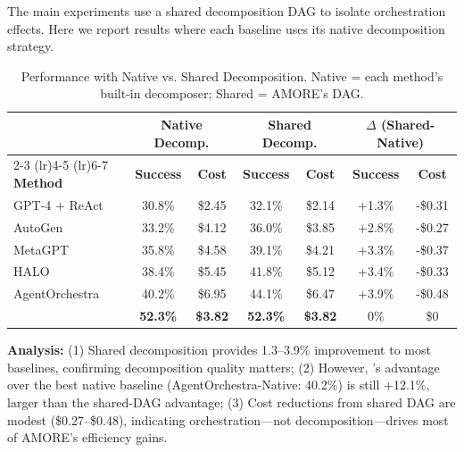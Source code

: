 \documentclass{article}
\theoremstyle{plain}
\theoremstyle{definition}
\theoremstyle{remark}
\begin{document}
The main experiments use a shared decomposition DAG to isolate orchestration effects. Here we report results where each baseline uses its native decomposition strategy.

\begin{table}[h]
	\caption{Performance with Native vs. Shared Decomposition. Native = each method's built-in decomposer; Shared = AMORE's DAG.}
	\label{tab:native_decomposition}
	\centering
	\small
	\begin{tabular}{@{}lcccccc@{}}
		\toprule
		& \multicolumn{2}{c}{\textbf{Native Decomp.}} & \multicolumn{2}{c}{\textbf{Shared Decomp.}} & \multicolumn{2}{c}{\textbf{$\Delta$ (Shared-Native)}} \\
		\cmidrule(lr){2-3} \cmidrule(lr){4-5} \cmidrule(lr){6-7}
		\textbf{Method} & \textbf{Success} & \textbf{Cost} & \textbf{Success} & \textbf{Cost} & \textbf{Success} & \textbf{Cost} \\
		\midrule
		GPT-4 + ReAct & 30.8\% & \$2.45 & 32.1\% & \$2.14 & +1.3\% & -\$0.31 \\
		AutoGen & 33.2\% & \$4.12 & 36.0\% & \$3.85 & +2.8\% & -\$0.27 \\
		MetaGPT & 35.8\% & \$4.58 & 39.1\% & \$4.21 & +3.3\% & -\$0.37 \\
		HALO & 38.4\% & \$5.45 & 41.8\% & \$5.12 & +3.4\% & -\$0.33 \\
		AgentOrchestra & 40.2\% & \$6.95 & 44.1\% & \$6.47 & +3.9\% & -\$0.48 \\
		\textbf{\amore{}} & \textbf{52.3\%} & \textbf{\$3.82} & \textbf{52.3\%} & \textbf{\$3.82} & 0\% & \$0 \\
		\bottomrule
	\end{tabular}
\end{table}

\textbf{Analysis:} (1) Shared decomposition provides 1.3--3.9\% improvement to most baselines, confirming decomposition quality matters; (2) However, \amore{}'s advantage over the best native baseline (AgentOrchestra-Native: 40.2\%) is still +12.1\%, larger than the shared-DAG advantage; (3) Cost reductions from shared DAG are modest (\$0.27--\$0.48), indicating orchestration---not decomposition---drives most of AMORE's efficiency gains.
\end{document}
